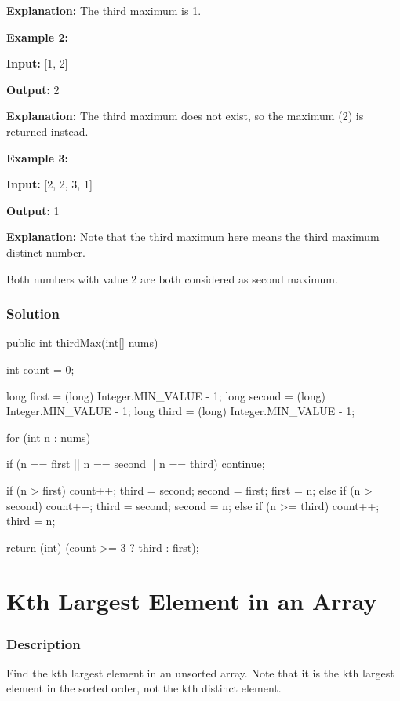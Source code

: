 \textbf{Explanation:} The third maximum is 1.

\textbf{Example 2:}

\textbf{Input:} [1, 2]

\textbf{Output:} 2

\textbf{Explanation:} The third maximum does not exist, so the maximum (2) is returned instead.

\textbf{Example 3:}

\textbf{Input:} [2, 2, 3, 1]

\textbf{Output:} 1

\textbf{Explanation:} Note that the third maximum here means the third maximum distinct number.

Both numbers with value 2 are both considered as second maximum.
\subsubsection{Solution}

\begin{Code}
public int thirdMax(int[] nums) {
    int count = 0;

    long first = (long) Integer.MIN_VALUE - 1;
    long second = (long) Integer.MIN_VALUE - 1;
    long third = (long) Integer.MIN_VALUE - 1;

    for (int n : nums) {
        if (n == first || n == second || n == third) {
            continue;
        }

        if (n > first) {
            count++;
            third = second;
            second = first;
            first = n;
        } else if (n > second) {
            count++;
            third = second;
            second = n;
        } else if (n >= third) {
            count++;
            third = n;
        }
    }

    return (int) (count >= 3 ? third : first);
}
\end{Code}

\newpage

\section{Kth Largest Element in an Array} %

\subsubsection{Description}
Find the kth largest element in an unsorted array. Note that it is the kth largest element in the sorted order, not the kth distinct element.

